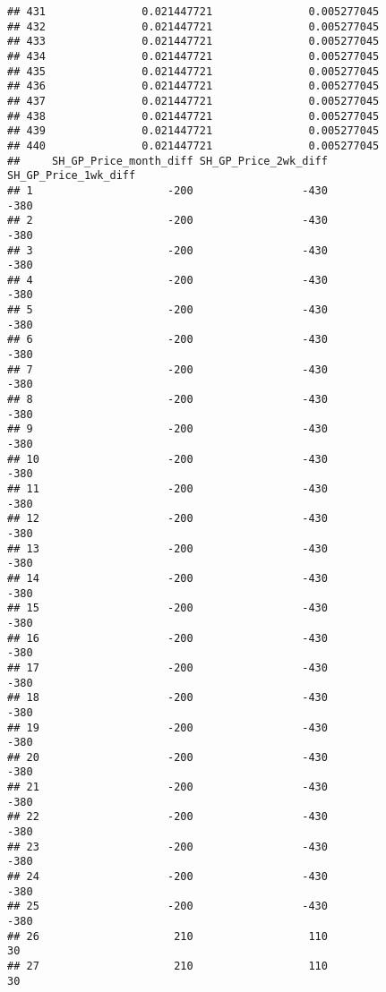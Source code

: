 \documentclass[]{article}
\begin{document}
\begin{verbatim}
## 431               0.021447721               0.005277045
## 432               0.021447721               0.005277045
## 433               0.021447721               0.005277045
## 434               0.021447721               0.005277045
## 435               0.021447721               0.005277045
## 436               0.021447721               0.005277045
## 437               0.021447721               0.005277045
## 438               0.021447721               0.005277045
## 439               0.021447721               0.005277045
## 440               0.021447721               0.005277045
##     SH_GP_Price_month_diff SH_GP_Price_2wk_diff SH_GP_Price_1wk_diff
## 1                     -200                 -430                 -380
## 2                     -200                 -430                 -380
## 3                     -200                 -430                 -380
## 4                     -200                 -430                 -380
## 5                     -200                 -430                 -380
## 6                     -200                 -430                 -380
## 7                     -200                 -430                 -380
## 8                     -200                 -430                 -380
## 9                     -200                 -430                 -380
## 10                    -200                 -430                 -380
## 11                    -200                 -430                 -380
## 12                    -200                 -430                 -380
## 13                    -200                 -430                 -380
## 14                    -200                 -430                 -380
## 15                    -200                 -430                 -380
## 16                    -200                 -430                 -380
## 17                    -200                 -430                 -380
## 18                    -200                 -430                 -380
## 19                    -200                 -430                 -380
## 20                    -200                 -430                 -380
## 21                    -200                 -430                 -380
## 22                    -200                 -430                 -380
## 23                    -200                 -430                 -380
## 24                    -200                 -430                 -380
## 25                    -200                 -430                 -380
## 26                     210                  110                   30
## 27                     210                  110                   30

\end{verbatim}
\end{document}
